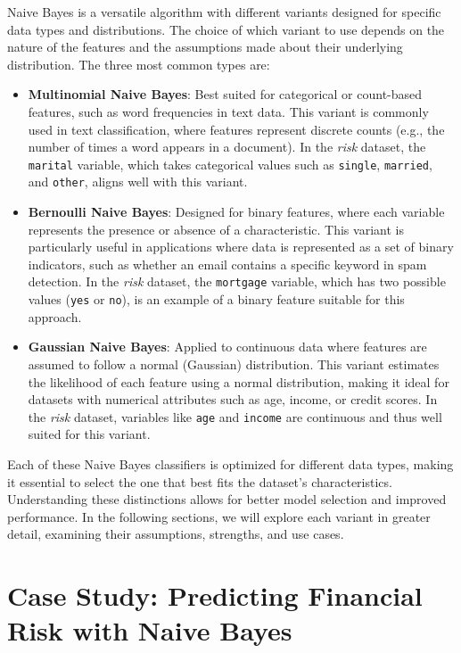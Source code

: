 \documentclass[
  11pt,
]{book}
\newcommand{\passthrough}[1]{#1}
\theoremstyle{definition}
\theoremstyle{definition}
\theoremstyle{definition}
\theoremstyle{definition}
\theoremstyle{remark}
\begin{document}
Naive Bayes is a versatile algorithm with different variants designed for specific data types and distributions. The choice of which variant to use depends on the nature of the features and the assumptions made about their underlying distribution. The three most common types are:

\begin{itemize}
\item
  \textbf{Multinomial Naive Bayes}: Best suited for categorical or count-based features, such as word frequencies in text data. This variant is commonly used in text classification, where features represent discrete counts (e.g., the number of times a word appears in a document). In the \emph{risk} dataset, the \passthrough{\lstinline!marital!} variable, which takes categorical values such as \passthrough{\lstinline!single!}, \passthrough{\lstinline!married!}, and \passthrough{\lstinline!other!}, aligns well with this variant.
\item
  \textbf{Bernoulli Naive Bayes}: Designed for binary features, where each variable represents the presence or absence of a characteristic. This variant is particularly useful in applications where data is represented as a set of binary indicators, such as whether an email contains a specific keyword in spam detection. In the \emph{risk} dataset, the \passthrough{\lstinline!mortgage!} variable, which has two possible values (\passthrough{\lstinline!yes!} or \passthrough{\lstinline!no!}), is an example of a binary feature suitable for this approach.
\item
  \textbf{Gaussian Naive Bayes}: Applied to continuous data where features are assumed to follow a normal (Gaussian) distribution. This variant estimates the likelihood of each feature using a normal distribution, making it ideal for datasets with numerical attributes such as age, income, or credit scores. In the \emph{risk} dataset, variables like \passthrough{\lstinline!age!} and \passthrough{\lstinline!income!} are continuous and thus well suited for this variant.
\end{itemize}

Each of these Naive Bayes classifiers is optimized for different data types, making it essential to select the one that best fits the dataset's characteristics. Understanding these distinctions allows for better model selection and improved performance. In the following sections, we will explore each variant in greater detail, examining their assumptions, strengths, and use cases.

\section{Case Study: Predicting Financial Risk with Naive Bayes}\label{case-study-predicting-financial-risk-with-naive-bayes}
\end{document}
